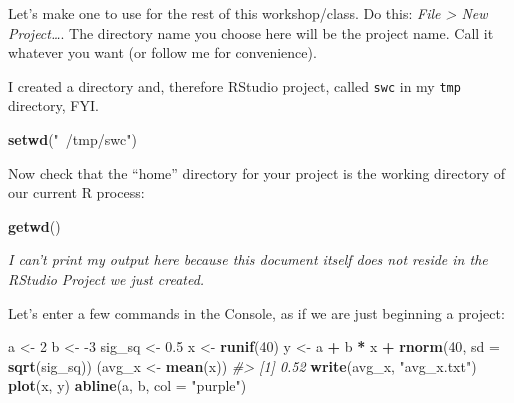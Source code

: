 \documentclass[
]{book}
\newenvironment{Shaded}{\begin{snugshade}}{\end{snugshade}}
\newcommand{\CommentTok}[1]{\textcolor[rgb]{0.56,0.35,0.01}{\textit{#1}}}
\newcommand{\DataTypeTok}[1]{\textcolor[rgb]{0.13,0.29,0.53}{#1}}
\newcommand{\DecValTok}[1]{\textcolor[rgb]{0.00,0.00,0.81}{#1}}
\newcommand{\FloatTok}[1]{\textcolor[rgb]{0.00,0.00,0.81}{#1}}
\newcommand{\KeywordTok}[1]{\textcolor[rgb]{0.13,0.29,0.53}{\textbf{#1}}}
\newcommand{\NormalTok}[1]{#1}
\newcommand{\OperatorTok}[1]{\textcolor[rgb]{0.81,0.36,0.00}{\textbf{#1}}}
\newcommand{\StringTok}[1]{\textcolor[rgb]{0.31,0.60,0.02}{#1}}
\begin{document}
Let's make one to use for the rest of this workshop/class. Do this: \emph{File \textgreater{} New Project\ldots{}}. The directory name you choose here will be the project name. Call it whatever you want (or follow me for convenience).

I created a directory and, therefore RStudio project, called \texttt{swc} in my \texttt{tmp} directory, FYI.

\begin{Shaded}
\begin{Highlighting}[]
\KeywordTok{setwd}\NormalTok{(}\StringTok{"~/tmp/swc"}\NormalTok{)}
\end{Highlighting}
\end{Shaded}

Now check that the ``home'' directory for your project is the working directory of our current R process:

\begin{Shaded}
\begin{Highlighting}[]
\KeywordTok{getwd}\NormalTok{()}
\end{Highlighting}
\end{Shaded}

\emph{I can't print my output here because this document itself does not reside in the RStudio Project we just created.}

Let's enter a few commands in the Console, as if we are just beginning a project:

\begin{Shaded}
\begin{Highlighting}[]
\NormalTok{a <-}\StringTok{ }\DecValTok{2}
\NormalTok{b <-}\StringTok{ }\DecValTok{-3}
\NormalTok{sig_sq <-}\StringTok{ }\FloatTok{0.5}
\NormalTok{x <-}\StringTok{ }\KeywordTok{runif}\NormalTok{(}\DecValTok{40}\NormalTok{)}
\NormalTok{y <-}\StringTok{ }\NormalTok{a }\OperatorTok{+}\StringTok{ }\NormalTok{b }\OperatorTok{*}\StringTok{ }\NormalTok{x }\OperatorTok{+}\StringTok{ }\KeywordTok{rnorm}\NormalTok{(}\DecValTok{40}\NormalTok{, }\DataTypeTok{sd =} \KeywordTok{sqrt}\NormalTok{(sig_sq))}
\NormalTok{(avg_x <-}\StringTok{ }\KeywordTok{mean}\NormalTok{(x))}
\CommentTok{#> [1] 0.52}
\KeywordTok{write}\NormalTok{(avg_x, }\StringTok{"avg_x.txt"}\NormalTok{)}
\KeywordTok{plot}\NormalTok{(x, y)}
\KeywordTok{abline}\NormalTok{(a, b, }\DataTypeTok{col =} \StringTok{"purple"}\NormalTok{)}
\end{Highlighting}
\end{Shaded}
\end{document}

